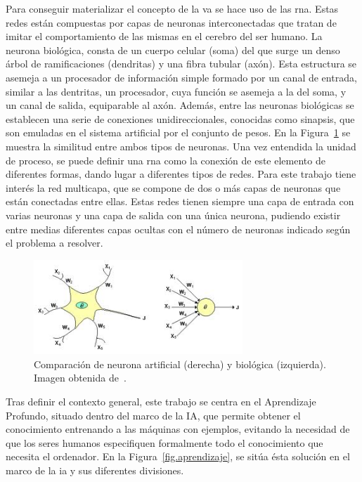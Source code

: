 Para conseguir materializar el concepto de la \acrshort{va} se hace uso de las \acrfull{rna}. Estas redes están compuestas por capas de neuronas interconectadas que tratan de imitar el comportamiento de las mismas en el cerebro del ser humano. La neurona biológica, consta de un cuerpo celular (soma) del que surge un denso árbol de ramificaciones (dendritas) y una fibra tubular (axón). Esta estructura se asemeja a un procesador de información simple formado por un canal de entrada, similar a las dentritas, un procesador, cuya función se asemeja a la del soma, y un canal de salida, equiparable al axón. Además, entre las neuronas biológicas se establecen una serie de conexiones unidireccionales, conocidas como sinapsis, que son emuladas en el sistema artificial por el conjunto de pesos. En la Figura~\ref{fig.rna} se muestra la similitud entre ambos tipos de neuronas. Una vez entendida la unidad de proceso, se puede definir una \acrshort{rna} como la conexión de este elemento de diferentes formas, dando lugar a diferentes tipos de redes. Para este trabajo tiene interés la red multicapa, que se compone de dos o más capas de neuronas que están conectadas entre ellas. Estas redes tienen siempre una capa de entrada con varias neuronas y una capa de salida con una única neurona, pudiendo existir entre medias diferentes capas ocultas con el número de neuronas indicado según el problema a resolver.\\

\begin{figure}[H]
	\begin{center}
		\includegraphics[width=0.7\textwidth]{figures/rna.jpg}
		\caption{Comparación de neurona artificial (derecha) y biológica (izquierda). Imagen obtenida de~\cite{rna}.}
		\label{fig.rna}
	\end{center}
\end{figure}

Tras definir el contexto general, este trabajo se centra en el Aprendizaje Profundo, situado dentro del marco de la IA, que permite obtener el conocimiento entrenando a las máquinas con ejemplos, evitando la necesidad de que los seres humanos especifiquen formalmente todo el conocimiento que necesita el ordenador. En la Figura~\ref{fig.aprendizaje}, se sitúa ésta solución en el marco de la \acrshort{ia} y sus diferentes divisiones.

